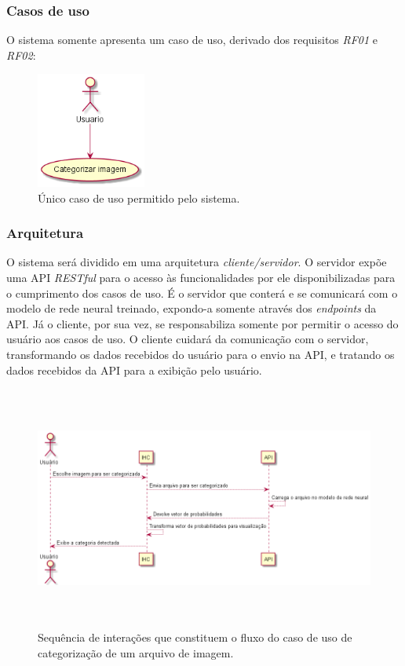\documentclass[12pt, a4paper]{article}
\begin{document}
\subsubsection{Casos de uso}
O sistema somente apresenta um caso de uso, derivado dos requisitos \emph{RF01} e \emph{RF02}:

\begin{figure}[H]
	\centering
	\includegraphics[width=\textwidth, height=3.8cm, keepaspectratio=true]{diagrams/usecase/UseCase}
	\caption{Único caso de uso permitido pelo sistema.}
\end{figure}

\subsubsection{Arquitetura}
O sistema será dividido em uma arquitetura \emph{cliente/servidor}. O servidor expõe uma API \emph{RESTful} para o acesso às funcionalidades por ele disponibilizadas para o cumprimento dos casos de uso. É o servidor que conterá e se comunicará com o modelo de rede neural treinado, expondo-a somente através dos \emph{endpoints} da API. Já o cliente, por sua vez, se responsabiliza somente por permitir o acesso do usuário aos casos de uso. O cliente cuidará da comunicação com o servidor, transformando os dados recebidos do usuário para o envio na API, e tratando os dados recebidos da API para a exibição pelo usuário.

\begin{figure}[H]
	\centering
	\includegraphics[width=\textwidth, height=8cm, keepaspectratio=true]{diagrams/sequence/Seq}
	\caption{Sequência de interações que constituem o fluxo do caso de uso de categorização de um arquivo de imagem.}
\end{figure}
\end{document}
